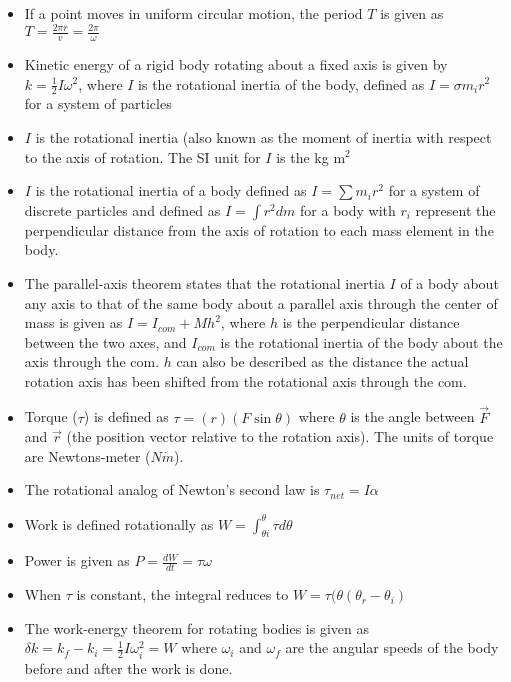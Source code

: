 \documentclass[10pt,letterpaper]{article}
\begin{document}
\begin{itemize}
\item If a point moves in uniform circular motion, the period $T$ is given as $T=\frac{2\pi r}{v}=\frac{2\pi}{\omega}$
\item Kinetic energy of a rigid body rotating about a fixed axis is given by $k=\frac{1}{2}I\omega^2$, where $I$ is the rotational inertia of the body, defined as $I=\sigma m_i r^2$ for a system of particles 
\item $I$ is the rotational inertia (also known as the moment of inertia with respect to the axis of rotation. The SI unit for $I$ is the kg m$^2$  \\ 
\item $I$ is the rotational inertia of a body defined as $I=\sum m_ir^2$ for a system of discrete particles and defined as $I=\int r^2dm$ for a body with $r_i$ represent the perpendicular distance from the axis of rotation to each mass element in the body. 
\item The parallel-axis theorem states that the rotational inertia $I$ of a body about any axis to that of the same body about a parallel axis through the center of mass is given as $I=I_{com}+Mh^2$, where $h$ is the perpendicular distance between the two axes, and $I_{com}$ is the rotational inertia of the body about the axis through the com. $h$ can also be described as the distance the actual rotation axis has been shifted from the rotational axis through the com. 
\item Torque ($\tau$) is defined as $\tau=(r)(F\sin \theta)$ where $\theta$ is the angle between $\vec{F}$ and $\vec{r}$ (the position vector relative to the rotation axis). The units of torque are Newtons-meter ($N\dot m$). 
\item The rotational analog of Newton's second law is $\tau_{net}=I\alpha$
\item Work is defined rotationally as $W=\int_{\theta i}^{\theta} \tau d\theta$ 
\item Power is given as $P=\frac{dW}{dt}=\tau\omega$ 
\item When $\tau$ is constant, the integral reduces to $W=\tau (\theta(\theta_r-\theta_i)$
\item The work-energy theorem for rotating bodies is given as $\delta k=k_f-k_i=\frac{1}{2}I\omega_i^2=W$ where $\omega_i$ and $\omega_f$ are the angular speeds of the body before and after the work is done. 

\end{itemize}
\end{document}
